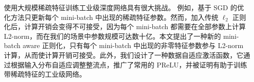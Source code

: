 
使用大规模稀疏特征训练工业级深度网络具有很大挑战。
例如，基于 SGD 的优化方法只更新每个 mini-batch 中出现的稀疏特征参数。然而，加入传统 $\ell_2$ 正则化后，计算开销会变得不可接受，因为每个 mini-batch 都需要在全部参数上计算 L2-norm，而在我们的场景中参数规模可达数十亿。本文提出了一种新的 mini-batch aware 正则化，只有每个 mini-batch 中出现的非零特征参数参与 L2-norm 计算，从而使计算开销可接受。此外，我们设计了一种数据自适应激活函数，它通过根据输入分布自适应调整整流点，推广了常用的 PReLU\cite{ms:prelu}，并被证明有助于训练带稀疏特征的工业级网络。


